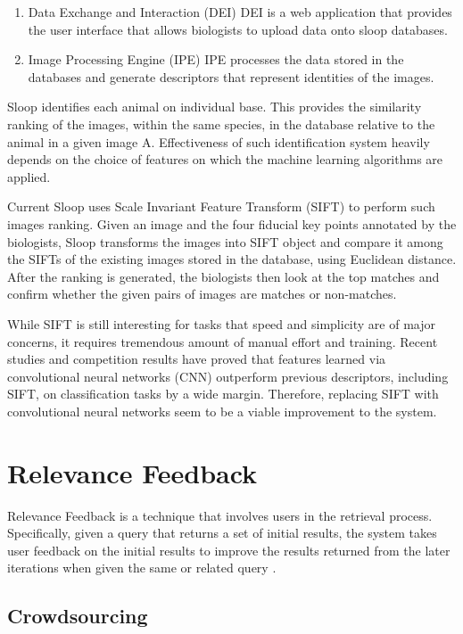 \begin{enumerate}
	\item Data Exchange and Interaction (DEI)
    DEI is a web application that provides the user interface that allows
    biologists to upload data onto sloop databases.
	\item Image Processing Engine (IPE)
    IPE processes the data stored in the databases and generate descriptors
    that represent identities of the images.
\end{enumerate}


Sloop identifies each animal on individual base. This provides the similarity
ranking of the images, within the same species, in the database relative to the
animal in a given image A. Effectiveness of such identification system heavily
depends on the choice of features on which the machine learning algorithms are
applied.

Current Sloop uses Scale Invariant Feature Transform (SIFT) \cite{lowe04} to
perform such images ranking. Given an image and the four fiducial key points
annotated by the biologists, Sloop transforms the images into SIFT object and
compare it among the SIFTs of the existing images stored in the database, using
Euclidean distance. After the ranking is generated, the biologists then look at
the top matches and confirm whether the given pairs of images are matches or
non-matches. 

While SIFT is still interesting for tasks that speed and simplicity are of
major concerns, it requires tremendous amount of manual effort and training.
Recent studies and competition results have proved that features learned via
convolutional neural networks (CNN) outperform previous descriptors, including
SIFT, on classification tasks by a wide margin\cite{fisher14}. Therefore,
replacing SIFT with convolutional neural networks seem to be a viable
improvement to the system.

\section{Relevance Feedback}

Relevance Feedback is a technique that involves users in the retrieval process.
Specifically, given a query that returns a set of initial results, the system
takes user feedback on the initial results to improve the results returned from
the later iterations when given the same or related query
\cite{manning2008introduction}.

\subsection{Crowdsourcing}

